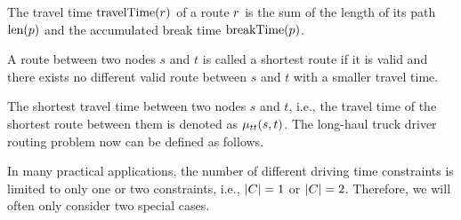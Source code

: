 \begin{definition}
	The travel time $\operatorname{travelTime}(r)$ of a route $r$ is the sum of the length of its path $\operatorname{len}(p)$ and the accumulated break time $\operatorname{breakTime}(p)$.
\end{definition}

\begin{definition}
	A route between two nodes $s$ and $t$ is called a shortest route if it is valid and there exists no different valid route between $s$ and $t$ with a smaller travel time.
\end{definition}

The shortest travel time between two nodes $s$ and $t$, i.e., the travel time of the shortest route between them is denoted as $\mu_{tt}(s,t)$. The long-haul truck driver routing problem now can be defined as follows.

\begin{namedproblem}
\end{namedproblem}

In many practical applications, the number of different driving time constraints is limited to only one or two constraints, i.e., $|C| = 1$ or  $|C| = 2$. Therefore, we will often only consider two special cases.